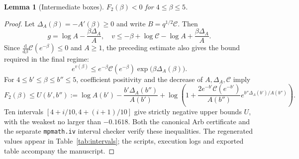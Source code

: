 \documentclass[10pt,a4paper]{article}
\numberwithin{equation}{section}
\newtheorem{lemma}[theorem]{Lemma}\newtheorem{proposition}[theorem]{Proposition}
\theoremstyle{remark}\newtheorem{remark}[theorem]{Remark}\newtheorem{question}[theorem]{Question}
\newcommand{\dd}{\mathrm d}
\begin{document}
\begin{lemma}[Intermediate boxes]\label{lem:middle}
$F_2(\beta)<0$ for $4\le\beta\le5$.
\end{lemma}
\begin{proof}Let $\Delta_A(\beta)=-A'(\beta)\ge0$ and write $B=q^{1/2}\mathcal C$. Then
\[
g=\log A-\frac{\beta\Delta_A}{A},\quad
v\le-\beta+\log\mathcal C-\log A+\frac{\beta\Delta_A}{A}.
\]
Since $\frac{\dd}{\dd\beta}\mathcal C(e^{-\beta})\le0$ and $A\ge1$, the preceding estimate also gives the bound required in the final regime:
\begin{equation}\label{eq:exp-v-bound}
e^{v(\beta)}\le e^{-\beta}\mathcal C(e^{-\beta})\exp\bigl(\beta\Delta_A(\beta)\bigr).
\end{equation}
For $4\le b'\le\beta\le b''\le5$, coefficient positivity and the decrease of $A,\Delta_A,\mathcal C$ imply
\begin{equation}\label{eq:box}
F_2(\beta)\le U(b',b''):=\log A(b')-\frac{b'\Delta_A(b'')}{A(b')}
+\log\left(1+\frac{2e^{-b'}\mathcal C(e^{-b'})}{A(b'')}e^{b''\Delta_A(b')/A(b'')}\right).
\end{equation}
Ten intervals $[4+i/10,4+(i+1)/10]$ give strictly negative upper bounds $U$, with the weakest no larger than $-0.1618$. Both the canonical Arb certificate and the separate \texttt{mpmath.iv} interval checker verify these inequalities. The regenerated values appear in Table~\ref{tab:intervals}; the scripts, execution logs and exported table accompany the manuscript.\end{proof}
\end{document}
